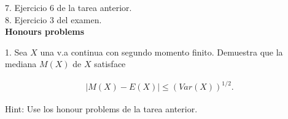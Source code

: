 \documentclass[11pt,letterpaper]{article}
\begin{document}
7. Ejercicio 6 de la tarea anterior.\\

8. Ejercicio 3 del examen.\\


\textbf{Honours problems}

1. Sea $X$ una v.a continua con segundo momento finito. Demuestra que la mediana $M(X)$ de $X$ satisface

\begin{align*}
|M(X)-E(X)|\leq (Var(X))^{1/2}.
\end{align*}

Hint: Use los honour problems de la tarea anterior.
\end{document}
